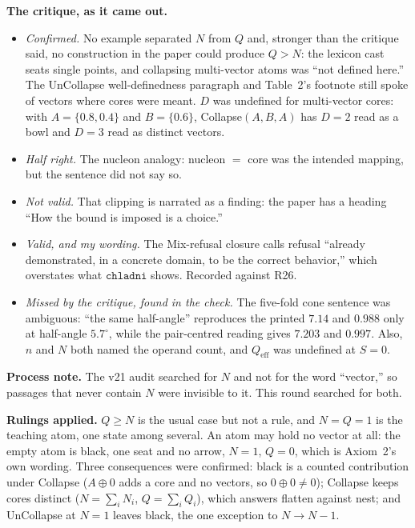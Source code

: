\documentclass[11pt]{article}
\begin{document}
\textbf{The critique, as it came out.}
\begin{itemize}
\item \emph{Confirmed.} No example separated $N$ from $Q$ and, stronger
than the critique said, no construction in the paper could produce
$Q>N$: the lexicon cast seats single points, and collapsing
multi-vector atoms was ``not defined here.'' The UnCollapse
well-definedness paragraph and Table~2's footnote still spoke of
vectors where cores were meant. $D$ was undefined for multi-vector cores:
with $A=\{0.8,0.4\}$ and $B=\{0.6\}$, Collapse$(A,B,A)$ has $D=2$ read as
a bowl and $D=3$ read as distinct vectors.
\item \emph{Half right.} The nucleon analogy: nucleon $=$ core was the
intended mapping, but the sentence did not say so.
\item \emph{Not valid.} That clipping is narrated as a finding: the paper
has a heading ``How the bound is imposed is a choice.''
\item \emph{Valid, and my wording.} The Mix-refusal closure calls refusal
``already demonstrated, in a concrete domain, to be the correct
behavior,'' which overstates what $\mathtt{chladni}$ shows. Recorded
against R26.
\item \emph{Missed by the critique, found in the check.} The five-fold
cone sentence was ambiguous: ``the same half-angle'' reproduces the
printed $7.14$ and $0.988$ only at half-angle $5.7^\circ$, while the
pair-centred reading gives $7.203$ and $0.997$. Also, $n$ and $N$ both
named the operand count, and $Q_{\mathrm{eff}}$ was undefined at $S=0$.
\end{itemize}

\textbf{Process note.} The v21 audit searched for $N$ and not for the word
``vector,'' so passages that never contain $N$ were invisible to it.
This round searched for both.

\textbf{Rulings applied.} $Q\ge N$ is the usual case but not a rule, and
$N=Q=1$ is the teaching atom, one state among several. An atom may hold
no vector at all: the empty atom is black, one seat and no arrow,
$N=1$, $Q=0$, which is Axiom~2's own wording. Three consequences were
confirmed: black is a counted contribution under Collapse ($A\oplus0$
adds a core and no vectors, so $0\oplus0\ne0$); Collapse keeps cores
distinct ($N=\sum_iN_i$, $Q=\sum_iQ_i$), which answers flatten against
nest; and UnCollapse at $N=1$ leaves black, the one exception to
$N\to N-1$.
\end{document}
